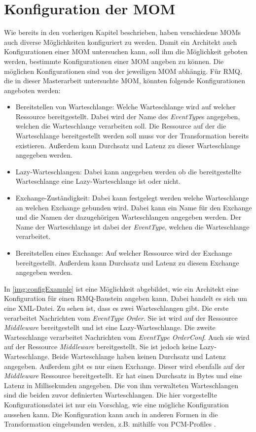 \section{Konfiguration der MOM}
Wie bereits in den vorherigen Kapitel beschrieben, haben verschiedene MOMs auch diverse Möglichkeiten konfiguriert zu werden. Damit ein Architekt auch Konfigurationen einer MOM untersuchen kann, soll ihm die Möglichkeit geboten werden, bestimmte Konfigurationen einer MOM angeben zu können. Die möglichen Konfigurationen sind von der jeweiligen MOM abhängig. Für RMQ, die in dieser Masterarbeit untersuchte MOM, könnten folgende Konfigurationen angeboten werden:
\begin{itemize}
    \item Bereitstellen von Warteschlange: Welche Warteschlange wird auf welcher Ressource bereitgestellt. Dabei wird der Name des \emph{EventType}s angegeben, welchen die Warteschlange verarbeiten soll. Die Ressource auf der die Warteschlange bereitgestellt werden soll muss vor der Transformation bereits existieren. Außerdem kann Durchsatz und Latenz zu dieser Warteschlange angegeben werden.
    \item Lazy-Warteschlangen: Dabei kann angegeben werden ob die bereitgestellte Warteschlange eine Lazy-Warteschlange ist oder nicht. 
    \item Exchange-Zuständigkeit: Dabei kann festgelegt werden welche Warteschlange an welchen Exchange gebunden wird. Dabei kann ein Name für den Exchange und die Namen der dazugehörigen Warteschlangen angegeben werden. Der Name der Warteschlange ist dabei der \emph{EventType}, welchen die Warteschlange verarbeitet.
    \item Bereitstellen eines Exchange: Auf welcher Ressource wird der Exchange bereitgestellt. Außerdem kann Durchsatz und Latenz zu diesem Exchange angegeben werden.
\end{itemize}
In \autoref{img:configExample} ist eine Möglichkeit abgebildet, wie ein Architekt eine Konfiguration für einen RMQ-Baustein angeben kann. Dabei handelt es sich um eine XML-Datei. Zu sehen ist, dass es zwei Warteschlangen gibt. Die erste verarbeitet Nachrichten vom \emph{EventType} \emph{Order}. Sie ist wird auf der Ressource \emph{Middleware} bereitgestellt und ist eine Lazy-Warteschlange. Die zweite Warteschlange verarbeitet Nachrichten vom \emph{EventType} \emph{OrderConf}. Auch sie wird auf der Ressource \emph{Middleware} bereitgestellt. Sie ist jedoch keine Lazy-Warteschlange. Beide Warteschlange haben keinen Durchsatz und Latenz angegeben. Außerdem gibt es nur einen Exchange. Dieser wird ebenfalls auf der \emph{Middleware} Ressource bereitgestellt. Er hat einen Durchsatz in Bytes und eine Latenz in Millisekunden angegeben. Die von ihm verwalteten Warteschlangen sind die beiden zuvor definierten Warteschlangen. Die hier vorgestellte Konfigurationsdatei ist nur ein Vorschlag, wie eine mögliche Konfiguration aussehen kann. Die Konfiguration kann auch in anderen Formen in die Transformation eingebunden werden, z.B. mithilfe von PCM-Profiles \cite{kramer2012b}.

